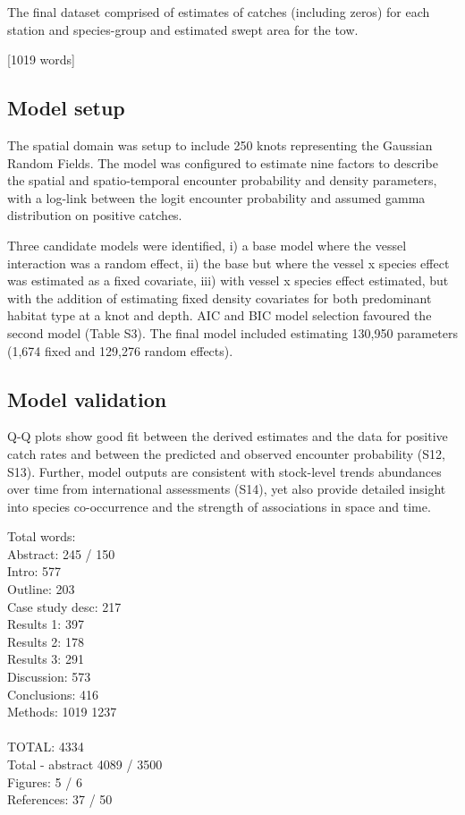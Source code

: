 \documentclass{nature}
\begin{document}
\begin{linenumbers}
The final dataset comprised of estimates of catches (including zeros) for each
station and species-group and estimated swept area for the tow.

[1019 words]

\subsection{Model setup}

The spatial domain was setup to include 250 knots representing the Gaussian
Random Fields. The model was configured to estimate nine factors to describe
the spatial and spatio-temporal encounter probability and density parameters,
with a log-link between the logit encounter probability and assumed gamma
distribution on positive catches.

Three candidate models were identified, i) a base model where the vessel
interaction was a random effect, ii) the base but where the vessel x species
effect was estimated as a fixed covariate, iii) with vessel x species effect
estimated, but with the addition of estimating fixed density covariates for
both predominant habitat type at a knot and depth. AIC and BIC model selection
favoured the second model (Table S3). The final model included estimating
130,950 parameters (1,674 fixed and 129,276 random effects).

\subsection{Model validation}

Q-Q plots show good fit between the derived estimates and the data for positive
catch rates and between the predicted and observed encounter probability (S12,
S13).  Further, model outputs are consistent with stock-level trends abundances
over time from international assessments (S14), yet also provide detailed
insight into species co-occurrence and the strength of associations in space
and time. 

Total words: \\
Abstract:	 	  245  / 150 \\
Intro:   		  577  \\
Outline:		  203 \\
Case study desc:	  217 \\
Results 1:		  397 \\
Results 2:		  178 \\
Results 3:		  291 \\
Discussion:	          573 \\
Conclusions:	          416  \\
Methods:		 1019 1237 \\
\\
TOTAL:			 4334 \\
Total - abstract         4089 / 3500 \\

Figures: 5 / 6 \\
References: 37 / 50 \\

\end{linenumbers}
\end{document}
